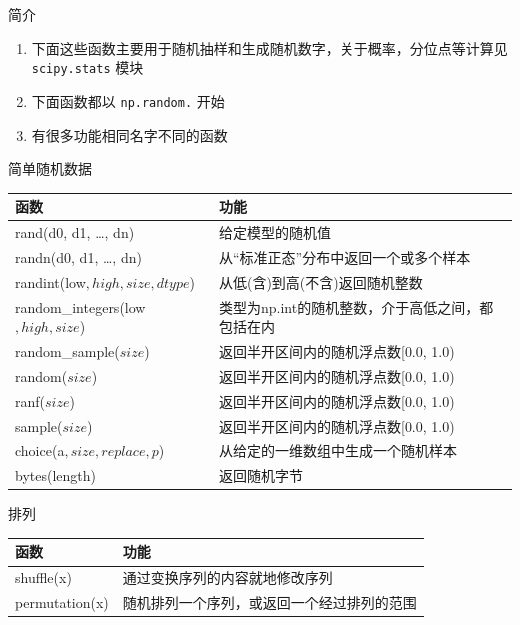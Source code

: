\documentclass[ignorenonframetext,11pt,xcolor=dvipsnames,hyperref={colorlinks,allcolors=.,urlcolor=blue, citecolor=violet, bookmarksdepth=4},aspectratio=1610]{beamer}
\providecommand{\tightlist}{%
  \setlength{\itemsep}{0pt}\setlength{\parskip}{0pt}}
\newcommand{\passthrough}[1]{#1}
\begin{document}
\begin{frame}[fragile]{简介}
\protect\hypertarget{section-35}{}

\begin{enumerate}
\tightlist
\item
  下面这些函数主要用于随机抽样和生成随机数字，关于概率，分位点等计算见
  \passthrough{\lstinline!scipy.stats!} 模块
\item
  下面函数都以 \passthrough{\lstinline!np.random.!} 开始
\item
  有很多功能相同名字不同的函数
\end{enumerate}

\end{frame}

\begin{frame}{简单随机数据}
\protect\hypertarget{section-36}{}

\scriptsize

\begin{longtable}[]{@{}ll@{}}
\toprule
函数 & 功能\tabularnewline
\midrule
\endhead
rand(d0, d1, \ldots, dn) & 给定模型的随机值\tabularnewline
randn(d0, d1, \ldots, dn) &
从``标准正态''分布中返回一个或多个样本\tabularnewline
randint(low\(, high, size, dtype\)) &
从低(含)到高(不含)返回随机整数\tabularnewline
random\_integers(low\(, high, size\)) &
类型为np.int的随机整数，介于高低之间，都包括在内\tabularnewline
random\_sample(\(size\)) & 返回半开区间内的随机浮点数{[}0.0,
1.0)\tabularnewline
random(\(size\)) & 返回半开区间内的随机浮点数{[}0.0, 1.0)\tabularnewline
ranf(\(size\)) & 返回半开区间内的随机浮点数{[}0.0, 1.0)\tabularnewline
sample(\(size\)) & 返回半开区间内的随机浮点数{[}0.0, 1.0)\tabularnewline
choice(a\(, size, replace, p\)) &
从给定的一维数组中生成一个随机样本\tabularnewline
bytes(length) & 返回随机字节\tabularnewline
\bottomrule
\end{longtable}

\end{frame}

\begin{frame}{排列}
\protect\hypertarget{section-37}{}

\begin{longtable}[]{@{}ll@{}}
\toprule
函数 & 功能\tabularnewline
\midrule
\endhead
shuffle(x) & 通过变换序列的内容就地修改序列\tabularnewline
permutation(x) &
随机排列一个序列，或返回一个经过排列的范围\tabularnewline
\bottomrule
\end{longtable}

\end{frame}
\end{document}
